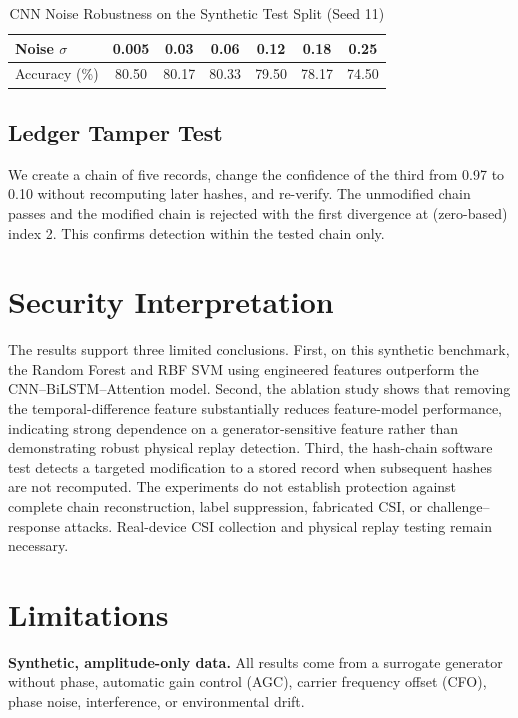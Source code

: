 \documentclass[conference]{IEEEtran}
\begin{document}
\begin{table}[t]
\caption{CNN Noise Robustness on the Synthetic Test Split (Seed 11)}
\label{tab:noise}
\centering
\footnotesize
\setlength{\tabcolsep}{3pt}
\begin{tabular}{@{}lcccccc@{}}
\toprule
Noise $\sigma$ & 0.005 & 0.03 & 0.06 & 0.12 & 0.18 & 0.25 \\
\midrule
Accuracy (\%) & 80.50 & 80.17 & 80.33 & 79.50 & 78.17 & 74.50 \\
\bottomrule
\end{tabular}
\end{table}

\subsection{Ledger Tamper Test}
We create a chain of five records, change the confidence of the third from 0.97 to 0.10 without recomputing later hashes, and re-verify. The unmodified chain passes and the modified chain is rejected with the first divergence at (zero-based) index 2. This confirms detection within the tested chain only.

\section{Security Interpretation}
The results support three limited conclusions. First, on this synthetic benchmark, the Random Forest and RBF SVM using engineered features outperform the CNN--BiLSTM--Attention model. Second, the ablation study shows that removing the temporal-difference feature substantially reduces feature-model performance, indicating strong dependence on a generator-sensitive feature rather than demonstrating robust physical replay detection. Third, the hash-chain software test detects a targeted modification to a stored record when subsequent hashes are not recomputed. The experiments do not establish protection against complete chain reconstruction, label suppression, fabricated CSI, or challenge--response attacks. Real-device CSI collection and physical replay testing remain necessary.

\section{Limitations}
\textbf{Synthetic, amplitude-only data.} All results come from a surrogate generator without phase, automatic gain control (AGC), carrier frequency offset (CFO), phase noise, interference, or environmental drift.
\end{document}
